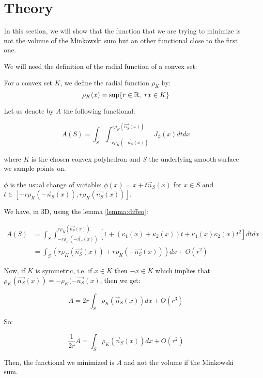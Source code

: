 
\section{Theory}

In this section, we will show that the function that we are trying to minimize
is not the volume of the Minkowski sum but an other functional close to the
first one.

We will need the definition of the radial function of a convex set:

\begin{definition}
    For a convex set $ K $, we define the radial function $ \rho_K $ by:
    $$ \rho_K(x) = \sup \{ r \in \mathbb{R},~rx \in K \} $$
\end{definition}

Let us denote by $ A $ the following functional:

$$ A(S) = \int_S \int_{-r \rho_K(-\vec{n}_S(x))}^{r \rho_K(\vec{n_S}(x))} J_\phi(x)
dt dx $$

where $ K $ is the chosen convex polyhedron and $ S $ the underlying smooth
surface we sample points on.

$ \phi $ is the usual change of variable: $ \phi(x) = x + t \vec{n}_S(x) $ for $
x \in S $ and $ t \in [-r \rho_K(-\vec{n}_S(x)), r \rho_K(\vec{n_S}(x)) ] $.

We have, in 3D, using the lemma \ref{lemma:diffeo}:

\begin{align*}
    A(S) &= \int_S \int_{-r \rho_K(-\vec{n}_S(x))}^{r \rho_K(\vec{n_S}(x))}
    \left[ 1 + (\kappa_1(x) + \kappa_2(x)) t + \kappa_1(x) \kappa_2(x) t^2
    \right] dt dx \\
    &= \int_S (r \rho_K(\vec{n_S}(x)) + r \rho_K(-\vec{n_S}(x))) dx + O(r^2)
\end{align*}

Now, if $ K $ is symmetric, i.e. if $ x \in K $ then $ -x \in K $ which implies
that $ \rho_K(\vec{n_S}(x)) = -\rho_K(-\vec{n_S}(x) $, then we get:

$$ A = 2r \int_S \rho_K(\vec{n}_S(x)) dx + O(r^3) $$

So:

$$ \frac{1}{2r} A = \int_S \rho_K(\vec{n}_S(x)) dx + O(r^2) $$

Then, the functional we minimized is $ A $ and not the volume if the Minkowski
sum.

